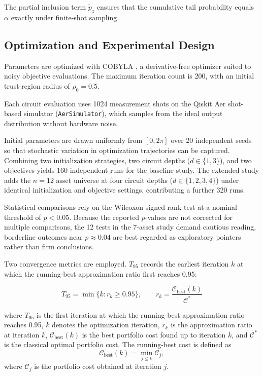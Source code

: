 \documentclass[runningheads]{llncs}
\begin{document}
The partial inclusion term $\tilde{p}_z$ ensures that the cumulative tail probability equals $\alpha$ exactly under finite-shot sampling.

\subsection{Optimization and Experimental Design}

Parameters are optimized with COBYLA \cite{powell1994}, a derivative-free optimizer suited to noisy objective evaluations. The maximum iteration count is 200, with an initial trust-region radius of \(\rho_0=0.5\).

Each circuit evaluation uses 1024 measurement shots on the Qiskit Aer shot-based simulator (\texttt{AerSimulator}), which samples from the ideal output distribution without hardware noise.

Initial parameters are drawn uniformly from $[0,2\pi]$ over 20 independent seeds so that stochastic variation in optimization trajectories can be captured. Combining two initialization strategies, two circuit depths ($d\in\{1,3\}$), and two objectives yields 160 independent runs for the baseline study. The extended study adds the $n=12$ asset universe at four circuit depths ($d\in\{1,2,3,4\}$) under identical initialization and objective settings, contributing a further 320 runs. 

Statistical comparisons rely on the Wilcoxon signed-rank test at a nominal threshold of $p<0.05$. Because the reported $p$-values are not corrected for multiple comparisons, the 12 tests in the 7-asset study demand cautious reading, borderline outcomes near $p\approx0.04$ are best regarded as exploratory pointers rather than firm conclusions.

Two convergence metrics are employed. $T_{95}$ records the earliest iteration $k$ at which the running-best approximation ratio first reaches 0.95:

\[
T_{95}=\min\{k:r_k\geq0.95\},\qquad
r_k=\frac{\mathcal{C}_{\mathrm{best}}(k)}{\mathcal{C}^{*}}
\]

where $T_{95}$ is the first iteration at which the running-best approximation ratio reaches 0.95, $k$ denotes the optimization iteration, $r_k$ is the approximation ratio at iteration $k$, $\mathcal{C}_{\mathrm{best}}(k)$ is the best portfolio cost found up to iteration $k$, and $\mathcal{C}^{*}$ is the classical optimal portfolio cost. The running-best cost is defined as
\[
\mathcal{C}_{\mathrm{best}}(k)=\min_{j\leq k}\mathcal{C}_j,
\]
where $\mathcal{C}_j$ is the portfolio cost obtained at iteration $j$.
\end{document}
